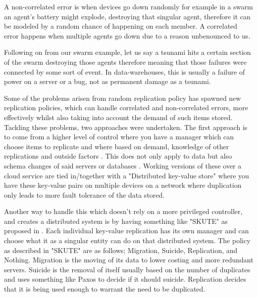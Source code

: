 \documentclass{UoYCSproject}
\begin{document}
A non-correlated error is when devices go down randomly for example in a swarm an agent's battery might explode, destroying that singular agent, therefore it can be modeled by a random chance of happening on each member. 
A correlated error happens when multiple agents go down due to a reason unbenounced to us. 

Following on from our swarm example, let us say a tsunami hits a certain section of the swarm destroying those agents therefore meaning that those failures were connected by some sort of event. 
In data-warehouses, this is usually a failure of power on a server or a bug, not as permanent damage as a tsunami.

Some of the problems arisen from random replication policy has spawned new replication policies, which can handle correlated and non-correlated errors, more effectively whilst also taking into account the demand of such items stored\cite{Avalability storage, Distributed Storage}.
Tackling these problems, two approaches were undertaken.
The first approach is to come from a higher level of control where you have a manager which can choose items to replicate and where based on demand, knowledge of other replications and outside factors \cite{Avalability storage, Patent}. 
This does not only apply to data but also schema changes of said servers or databases \cite{Scheme changes}.
Working versions of these over a cloud service are tied in/together with a "Distributed key-value store" \cite{Key-Value} where you have these key-value pairs on multiple devices on a network where duplication only leads to more fault tolerance of the data stored.

Another way to handle this which doesn't rely on a more privileged controller, and creates a distributed system is by having something like "SKUTE" as proposed in \cite{Distributed Storage}.
Each individual key-value replication has its own manager and can choose what it as a singular entity can do on that distributed system.
The policy as described in "SKUTE" are as follows; Migration, Suicide, Replication, and Nothing. 
Migration is the moving of its data to lower costing and more redundant servers. 
Suicide is the removal of itself usually based on the number of duplicates and uses something like Paxos \cite{Paxos} to decide if it should suicide. 
Replication decides that it is being used enough to warrant the need to be duplicated.
\end{document}
